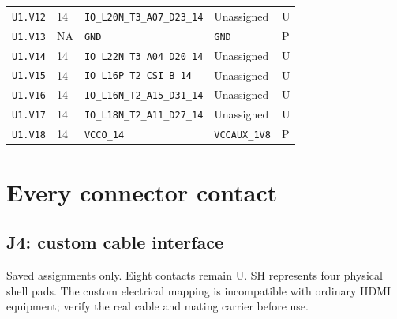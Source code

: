 \documentclass[11pt,a4paper]{article}
\begin{document}
\begin{longtable}{@{}P{20mm}P{10mm}P{70mm}P{51mm}P{11mm}@{}}
\nolinkurl{U1.V12} & 14 & \nolinkurl{IO_L20N_T3_A07_D23_14} & Unassigned & U \\
\nolinkurl{U1.V13} & NA & \nolinkurl{GND} & \nolinkurl{GND} & P \\
\nolinkurl{U1.V14} & 14 & \nolinkurl{IO_L22N_T3_A04_D20_14} & Unassigned & U \\
\nolinkurl{U1.V15} & 14 & \nolinkurl{IO_L16P_T2_CSI_B_14} & Unassigned & U \\
\nolinkurl{U1.V16} & 14 & \nolinkurl{IO_L16N_T2_A15_D31_14} & Unassigned & U \\
\nolinkurl{U1.V17} & 14 & \nolinkurl{IO_L18N_T2_A11_D27_14} & Unassigned & U \\
\nolinkurl{U1.V18} & 14 & \nolinkurl{VCCO_14} & \nolinkurl{VCCAUX_1V8} & P \\
\end{longtable}\endgroup

\clearpage\section{Every connector contact}\label{app:connectors}
\subsection*{J4: custom cable interface}
Saved assignments only. Eight contacts remain U. SH represents four physical shell pads. The custom electrical mapping is incompatible with ordinary HDMI equipment; verify the real cable and mating carrier before use.
\end{document}
